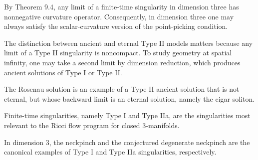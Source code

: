 \begin{remark}
\label{ch08-rem-dimension-three-scalar-curvature}

By Theorem 9.4, any limit of a finite-time singularity in dimension three has nonnegative curvature operator. Consequently, in dimension three one may always satisfy the scalar-curvature version of the point-picking condition.
\end{remark}

\begin{remark}
\label{ch08-rem-ancient-eternal-type-ii}

The distinction between ancient and eternal Type II models matters because any limit of a Type II singularity is noncompact. To study geometry at spatial infinity, one may take a second limit by dimension reduction, which produces ancient solutions of Type I or Type II.
\end{remark}

\begin{example}
\label{ch08-ex-rosenau-solution}

The Rosenau solution is an example of a Type II ancient solution that is not eternal, but whose backward limit is an eternal solution, namely the cigar soliton.
\end{example}

\begin{remark}
\label{ch08-rem-finite-time-singularities}

Finite-time singularities, namely Type I and Type IIa, are the singularities most relevant to the Ricci flow program for closed \(3\)-manifolds.
\end{remark}

\begin{example}
\label{ch08-ex-neckpinch-degenerate-neckpinch}

In dimension \(3\), the neckpinch and the conjectured degenerate neckpinch are the canonical examples of Type I and Type IIa singularities, respectively.
\end{example}

